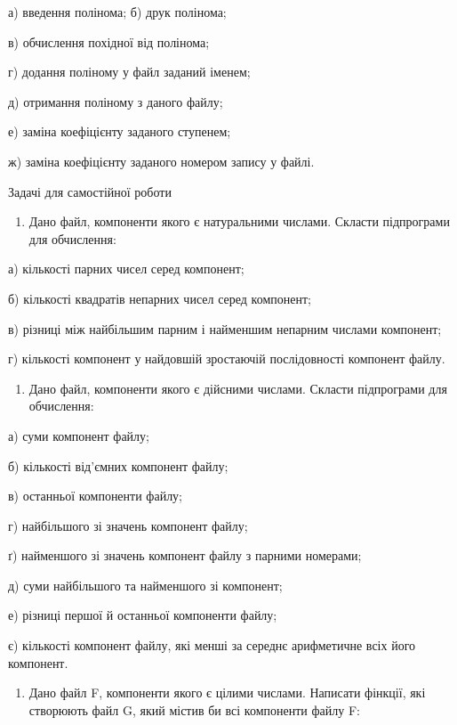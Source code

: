 \documentclass[]{article}
\begin{document}
а) введення полінома; б) друк полінома;

в) обчислення похідної від полінома;

г) додання поліному у файл заданий іменем;

д) отримання поліному з даного файлу;

е) заміна коефіцієнту заданого ступенем;

ж) заміна коефіцієнту заданого номером запису у файлі.

Задачі для самостійної роботи

\begin{enumerate}
\def\labelenumi{\arabic{enumi})}
\item
  Дано файл, компоненти якого є натуральними числами. Скласти
  підпрограми для обчислення:
\end{enumerate}

а) кількості парних чисел серед компонент;

б) кількості квадратів непарних чисел серед компонент;

в) різниці між найбільшим парним і найменшим непарним числами компонент;

г) кількості компонент у найдовшій зростаючій послідовності компонент
файлу.

\begin{enumerate}
\def\labelenumi{\arabic{enumi})}
\item
  Дано файл, компоненти якого є дійсними числами. Скласти підпрограми
  для обчислення:
\end{enumerate}

а) суми компонент файлу;

б) кількості від'ємних компонент файлу;

в) останньої компоненти файлу;

г) найбільшого зі значень компонент файлу;

ґ) найменшого зі значень компонент файлу з парними номерами;

д) суми найбільшого та найменшого зі компонент;

е) різниці першої й останньої компоненти файлу;

є) кількості компонент файлу, які менші за середнє арифметичне всіх його
компонент.

\begin{enumerate}
\def\labelenumi{\arabic{enumi})}
\item
  Дано файл F, компоненти якого є цілими числами. Написати фінкції, які
  створюють файл G, який містив би всі компоненти файлу F:
\end{enumerate}
\end{document}
